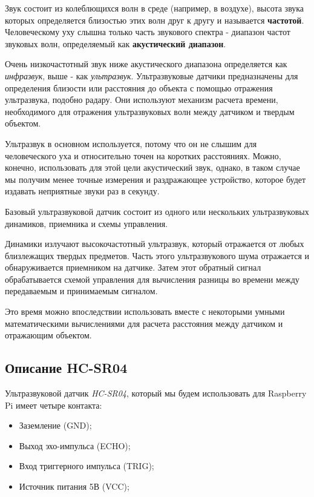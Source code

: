 \documentclass[a4paper, 14pt]{article}
\begin{document}
Звук состоит из колеблющихся волн в среде (например, в воздухе), высота звука которых определяется близостью этих волн друг к другу и называется \textbf{частотой}. Человеческому уху слышна только часть звукового спектра - диапазон частот звуковых волн, определяемый как \textbf{акустический диапазон}.

Очень низкочастотный звук ниже акустического диапазона определяется как \textit{инфразвук}, выше - как \textit{ультразвук}. Ультразвуковые датчики предназначены для определения близости или расстояния до объекта с помощью отражения ультразвука, подобно радару. Они используют механизм расчета времени, необходимого для отражения ультразвуковых волн между датчиком и твердым объектом.

Ультразвук в основном используется, потому что он не слышим для человеческого уха и относительно точен на коротких расстояниях. Можно, конечно, использовать для этой цели акустический звук, однако, в таком случае мы получим менее точные измерения и раздражающее устройство, которое будет издавать неприятные звуки раз в секунду.

Базовый ультразвуковой датчик состоит из одного или нескольких ультразвуковых динамиков, приемника и схемы управления.

Динамики излучают высокочастотный ультразвук, который отражается от любых близлежащих твердых предметов. Часть этого ультразвукового шума отражается и обнаруживается приемником на датчике. Затем этот обратный сигнал обрабатывается схемой управления для вычисления разницы во времени между передаваемым и принимаемым сигналом.

Это время можно впоследствии использовать вместе с некоторыми умными математическими вычислениями для расчета расстояния между датчиком и отражающим объектом.

\subsection{Описание HC-SR04}

Ультразвуковой датчик \textit{HC-SR04}, который мы будем использовать для Raspberry Pi имеет четыре контакта:

\begin{itemize}
	\item Заземление (GND);
	\item Выход эхо-импульса (ECHO);
	\item Вход триггерного импульса (TRIG);
	\item Источник питания 5В (VCC);
\end{itemize}
\end{document}
